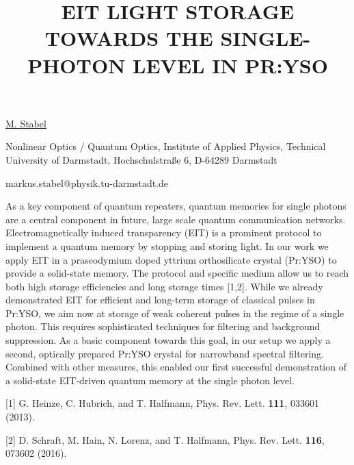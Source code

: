 \title{EIT LIGHT STORAGE TOWARDS THE SINGLE-PHOTON LEVEL IN PR:YSO}

\underline{M. Stabel} 

{\normalsize{\vspace{-4mm}
Nonlinear Optics / Quantum Optics,
Institute of Applied Physics,
Technical University of Darmstadt,
Hochschulstraße 6,
D-64289 Darmstadt



\email markus.stabel@physik.tu-darmstadt.de}}

As a key component of quantum repeaters, quantum memories for single photons are a central component in future, large scale quantum communication networks. Electromagnetically induced transparency (EIT) is a prominent protocol to implement a quantum memory by stopping and storing light. In our work we apply EIT in a praseodymium doped yttrium orthosilicate crystal (Pr:YSO) to provide a solid-state memory. The protocol and specific medium allow us to reach both high storage efficiencies and long storage times [1,2]. While we already demonstrated EIT for efficient and long-term storage of classical pulses in Pr:YSO, we aim now at storage of weak coherent pulses in the regime of a single photon. This requires sophisticated techniques for filtering and background suppression. As a basic component towards this goal, in our setup we apply a second, optically prepared Pr:YSO crystal for narrowband spectral filtering. Combined with other measures, this enabled our first successful demonstration of a solid-state EIT-driven quantum memory at the single photon level.

{\normalsize
[1] G. Heinze, C. Hubrich, and T. Halfmann, Phys. Rev. Lett. \textbf{111}, 033601 (2013).
\vsp

[2] D. Schraft, M. Hain, N. Lorenz, and T. Halfmann, Phys. Rev. Lett. \textbf{116}, 073602 (2016).
}

\vspace{\baselineskip}